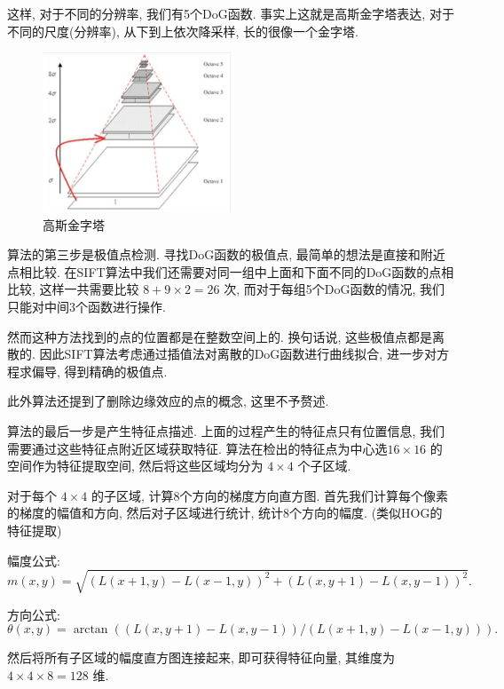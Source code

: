 \documentclass[lang=cn,12pt,a4paper]{elegantpaper}
\begin{document}
这样, 对于不同的分辨率, 我们有5个DoG函数. 事实上这就是高斯金字塔表达, 对于不同的尺度(分辨率), 从下到上依次降采样, 长的很像一个金字塔.
\begin{figure}[h]
    \centering
    \includegraphics[width=0.5\textwidth]{lateximgs/1.png}
    \caption{高斯金字塔}
    \label{fig:example}
\end{figure}

算法的第三步是极值点检测. 寻找DoG函数的极值点, 最简单的想法是直接和附近点相比较. 在SIFT算法中我们还需要对同一组中上面和下面不同的DoG函数的点相比较, 这样一共需要比较 $8+9\times2=26$ 次, 而对于每组5个DoG函数的情况, 我们只能对中间3个函数进行操作.

然而这种方法找到的点的位置都是在整数空间上的. 换句话说, 这些极值点都是离散的. 因此SIFT算法考虑通过插值法对离散的DoG函数进行曲线拟合, 进一步对方程求偏导, 得到精确的极值点.

此外算法还提到了删除边缘效应的点的概念, 这里不予赘述.

算法的最后一步是产生特征点描述. 上面的过程产生的特征点只有位置信息, 我们需要通过这些特征点附近区域获取特征. 算法在检出的特征点为中心选$16\times16$ 的空间作为特征提取空间, 然后将这些区域均分为 $4 \times 4$ 个子区域. 

对于每个 $4 \times 4$ 的子区域, 计算8个方向的梯度方向直方图. 首先我们计算每个像素的梯度的幅值和方向, 然后对子区域进行统计, 统计8个方向的幅度. (类似HOG的特征提取)

幅度公式:
\begin{equation*}
    m(x, y) = \sqrt{\left(L(x+1, y)-L(x-1, y)\right)^2+\left(L(x, y+1)-L(x, y-1)\right)^2}.
\end{equation*}

方向公式:
\begin{equation*}
    \theta(x, y) = \arctan\left((L(x, y+1)-L(x, y-1))/(L(x+1, y)-L(x-1, y))\right).
\end{equation*}

然后将所有子区域的幅度直方图连接起来, 即可获得特征向量, 其维度为 $4 \times 4 \times 8 = 128$ 维.
\end{document}
